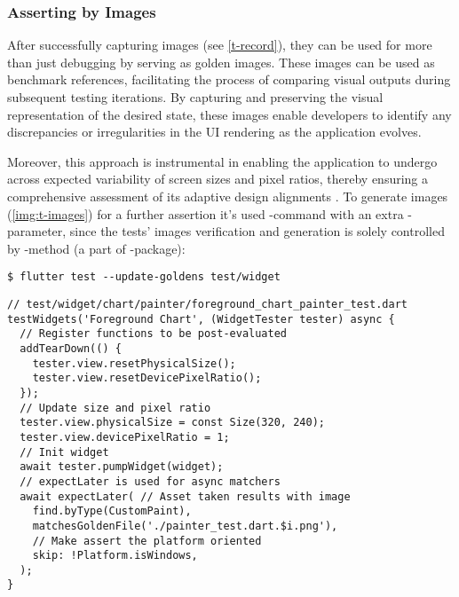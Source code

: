 \subsubsection{Asserting by Images} \label{golden-image}

After successfully capturing images (see \cref{t-record}), they can be used for more than just debugging by serving as 
golden images. These images can be used as benchmark references, facilitating the process of comparing visual outputs 
during subsequent testing iterations. By capturing and preserving the visual representation of the desired state, these 
images enable developers to identify any discrepancies or irregularities in the UI rendering as the application evolves.

Moreover, this approach is instrumental in enabling the application to undergo across expected variability of screen 
sizes and pixel ratios, thereby ensuring a comprehensive assessment of its adaptive design alignments 
. To generate images (\cref{img:t-images}) for a further assertion it's used -command with 
an extra -parameter, since the tests' images verification and generation is solely controlled by
-method (a part of -package):

\begin{lstlisting}[language=terminal]
$ flutter test --update-goldens test/widget
\end{lstlisting}

\begin{lstlisting}
// test/widget/chart/painter/foreground_chart_painter_test.dart
testWidgets('Foreground Chart', (WidgetTester tester) async {
  // Register functions to be post-evaluated
  addTearDown(() {
    tester.view.resetPhysicalSize();
    tester.view.resetDevicePixelRatio();
  });
  // Update size and pixel ratio
  tester.view.physicalSize = const Size(320, 240);
  tester.view.devicePixelRatio = 1;
  // Init widget
  await tester.pumpWidget(widget);
  // expectLater is used for async matchers
  await expectLater( // Asset taken results with image
    find.byType(CustomPaint),
    matchesGoldenFile('./painter_test.dart.$i.png'),
    // Make assert the platform oriented
    skip: !Platform.isWindows,
  );
}
\end{lstlisting}


